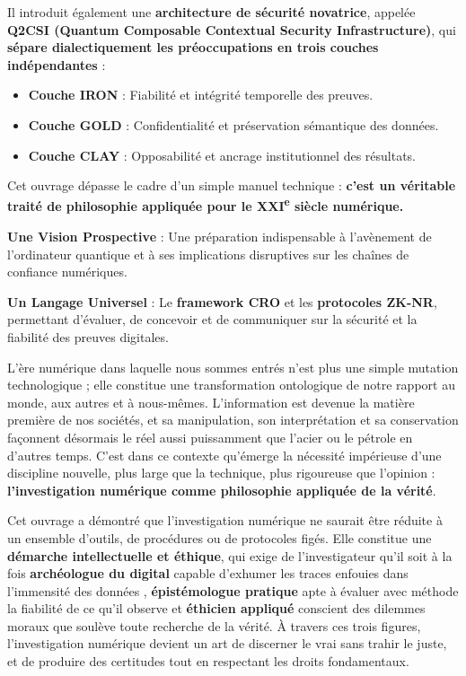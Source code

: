\documentclass[11pt]{article}
\begin{document}
\vspace{0.3cm}

\noindent Il introduit également une \textbf{architecture de sécurité novatrice}, appelée 
\textbf{Q2CSI (Quantum Composable Contextual Security Infrastructure)}, 
qui \textbf{sépare dialectiquement les préoccupations en trois couches indépendantes} :

\begin{itemize}
    \item \textbf{Couche IRON} : Fiabilité et intégrité temporelle des preuves.
    \item \textbf{Couche GOLD} : Confidentialité et préservation sémantique des données.
    \item \textbf{Couche CLAY} : Opposabilité et ancrage institutionnel des résultats.
\end{itemize}

\vspace{0.5cm}

\noindent Cet ouvrage dépasse le cadre d’un simple manuel technique : 
\textbf{c’est un véritable traité de philosophie appliquée pour le XXI\textsuperscript{e} siècle numérique.}  

    \item \textbf{Une Vision Prospective} : Une préparation indispensable à l’avènement de l’ordinateur quantique 
    et à ses implications disruptives sur les chaînes de confiance numériques.
    
    \item \textbf{Un Langage Universel} : Le \textbf{framework CRO} et les \textbf{protocoles ZK-NR}, 
    permettant d’évaluer, de concevoir et de communiquer sur la sécurité et la fiabilité des preuves digitales.

L’ère numérique dans laquelle nous sommes entrés n’est plus une simple mutation technologique ; elle constitue une transformation ontologique de notre rapport au monde, aux autres et à nous-mêmes. L’information est devenue la matière première de nos sociétés, et sa manipulation, son interprétation et sa conservation façonnent désormais le réel aussi puissamment que l’acier ou le pétrole en d’autres temps. C’est dans ce contexte qu’émerge la nécessité impérieuse d’une discipline nouvelle, plus large que la technique, plus rigoureuse que l’opinion : \textbf{l’investigation numérique comme philosophie appliquée de la vérité}.

Cet ouvrage a démontré que l’investigation numérique ne saurait être réduite à un ensemble d’outils, de procédures ou de protocoles figés. Elle constitue une \textbf{démarche intellectuelle et éthique}, qui exige de l’investigateur qu’il soit à la fois \textbf{archéologue du digital} capable d’exhumer les traces enfouies dans l’immensité des données , \textbf{épistémologue pratique} apte à évaluer avec méthode la fiabilité de ce qu’il observe et \textbf{éthicien appliqué}  conscient des dilemmes moraux que soulève toute recherche de la vérité. 
À travers ces trois figures, l’investigation numérique devient un art de discerner le vrai sans trahir le juste, et de produire des certitudes tout en respectant les droits fondamentaux.
\end{document}
